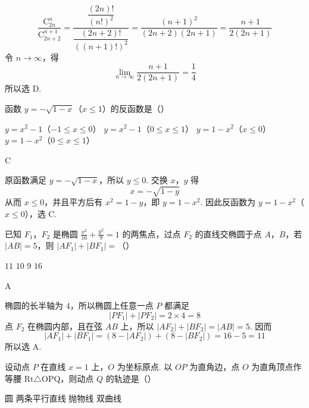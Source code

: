 \begin{solution}
\[
\frac{\mathrm C_{2n}^{n}}{\mathrm C_{2n+2}^{n+1}}
=\frac{\dfrac{(2n)!}{(n!)^2}}{\dfrac{(2n+2)!}{((n+1)!)^2}}
=\frac{(n+1)^2}{(2n+2)(2n+1)}
=\frac{n+1}{2(2n+1)}
\]
令 \(n\to\infty\)，得
\[
\lim_{n\to\infty}\frac{n+1}{2(2n+1)}=\frac14
\]
所以选 D.
\end{solution}

\begin{problem}
函数 \(y = -\sqrt{1 - x}\)（\(x \leqslant 1\)）的反函数是（\quad）

\choices
    {\(y = x^{2} - 1\)（\(-1 \leqslant x \leqslant 0\)）}
    {\(y = x^{2} - 1\)（\(0 \leqslant x \leqslant 1\)）}
    {\(y = 1 - x^{2}\)（\(x \leqslant 0\)）}
    {\(y = 1 - x^{2}\)（\(0 \leqslant x \leqslant 1\)）}
\end{problem}

\begin{answer}
C
\end{answer}

\begin{solution}
原函数满足 \(y=-\sqrt{1-x}\)，所以 \(y\leqslant0\). 交换 \(x\)，\(y\) 得
\[
x=-\sqrt{1-y}
\]
从而 \(x\leqslant0\)，并且平方后有 \(x^2=1-y\)，即 \(y=1-x^2\). 因此反函数为 \(y=1-x^2\)（\(x\leqslant0\)），选 C.
\end{solution}

\begin{problem}
已知 \(F_{1}\)，\(F_{2}\) 是椭圆 \(\frac{x^{2}}{16} + \frac{y^{2}}{9} = 1\) 的两焦点，过点 \(F_{2}\) 的直线交椭圆于点 \(A\)，\(B\)，若 \(\left|AB\right| = 5\)，则 \(\left|AF_{1}\right| + \left|BF_{1}\right| =\)（\quad）

\choices
    {\(11\)}
    {\(10\)}
    {\(9\)}
    {\(16\)}
\end{problem}

\begin{answer}
A
\end{answer}

\begin{solution}
椭圆的长半轴为 \(4\)，所以椭圆上任意一点 \(P\) 都满足
\[
|PF_1|+|PF_2|=2\times4=8
\]
点 \(F_2\) 在椭圆内部，且在弦 \(AB\) 上，所以 \(|AF_2|+|BF_2|=|AB|=5\). 因而
\[
|AF_1|+|BF_1|
=(8-|AF_2|)+(8-|BF_2|)
=16-5=11
\]
所以选 A.
\end{solution}

\begin{problem}
设动点 \(P\) 在直线 \(x = 1\) 上，\(O\) 为坐标原点. 以 \(OP\) 为直角边，点 \(O\) 为直角顶点作等腰 \(\mathrm{Rt}\triangle\mathrm{OPQ}\)，则动点 \(Q\) 的轨迹是（\quad）

\choices
    {圆}
    {两条平行直线}
    {抛物线}
    {双曲线}
\end{problem}

